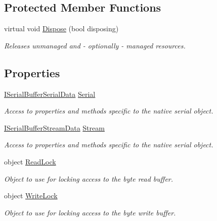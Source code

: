 \subsection*{Protected Member Functions}
\begin{DoxyCompactItemize}
\item 
virtual void \mbox{\hyperlink{class_r_j_c_p_1_1_i_o_1_1_ports_1_1_native_1_1_serial_buffer_ac55fef8b189d4cb839461245f61180db}{Dispose}} (bool disposing)
\begin{DoxyCompactList}\small\item\em Releases unmanaged and -\/ optionally -\/ managed resources. \end{DoxyCompactList}\end{DoxyCompactItemize}
\subsection*{Properties}
\begin{DoxyCompactItemize}
\item 
\mbox{\hyperlink{interface_r_j_c_p_1_1_i_o_1_1_ports_1_1_native_1_1_i_serial_buffer_serial_data}{I\+Serial\+Buffer\+Serial\+Data}} \mbox{\hyperlink{class_r_j_c_p_1_1_i_o_1_1_ports_1_1_native_1_1_serial_buffer_a37599d95e399d497f84c255e95040ee6}{Serial}}
\begin{DoxyCompactList}\small\item\em Access to properties and methods specific to the native serial object. \end{DoxyCompactList}\item 
\mbox{\hyperlink{interface_r_j_c_p_1_1_i_o_1_1_ports_1_1_native_1_1_i_serial_buffer_stream_data}{I\+Serial\+Buffer\+Stream\+Data}} \mbox{\hyperlink{class_r_j_c_p_1_1_i_o_1_1_ports_1_1_native_1_1_serial_buffer_a83712b1cfa86968f5723eec218c5d869}{Stream}}
\begin{DoxyCompactList}\small\item\em Access to properties and methods specific to the native serial object. \end{DoxyCompactList}\item 
object \mbox{\hyperlink{class_r_j_c_p_1_1_i_o_1_1_ports_1_1_native_1_1_serial_buffer_ad5684d554f4851a376ba471fb056450d}{Read\+Lock}}
\begin{DoxyCompactList}\small\item\em Object to use for locking access to the byte read buffer. \end{DoxyCompactList}\item 
object \mbox{\hyperlink{class_r_j_c_p_1_1_i_o_1_1_ports_1_1_native_1_1_serial_buffer_ac67cc8962ba8aefbe4822846b763ac36}{Write\+Lock}}
\begin{DoxyCompactList}\small\item\em Object to use for locking access to the byte write buffer. \end{DoxyCompactList}\end{DoxyCompactItemize}
